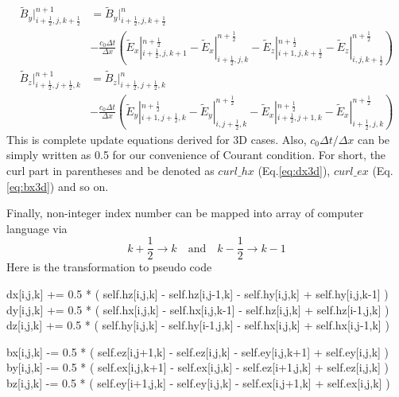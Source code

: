 \begin{equation}\label{eq:by3d}
  \begin{split}
    \widetilde{B}_y|_{i+\frac{1}{2},j,k+\frac{1}{2}}^{n+1} & = \widetilde{B}_y|_{i+\frac{1}{2},j,k+\frac{1}{2}}^{n}\\
    & - \frac{c_0\Delta t}{\Delta x}\left(\widetilde{E}_x|_{i+\frac{1}{2},j,k+1}^{n+\frac{1}{2}} - \widetilde{E}_x|_{i+\frac{1}{2},j,k}^{n+\frac{1}{2}} - \widetilde{E}_z|_{i+1,j,k+\frac{1}{2}}^{n+\frac{1}{2}} - \widetilde{E}_z|_{i,j,k+\frac{1}{2}}^{n+\frac{1}{2}}\right)
  \end{split}
\end{equation}
\begin{equation}
  \begin{split}
    \widetilde{B}_z|_{i+\frac{1}{2},j+\frac{1}{2},k}^{n+1} & = \widetilde{B}_z|_{i+\frac{1}{2},j+\frac{1}{2},k}^{n}\\
    & - \frac{c_0\Delta t}{\Delta x}\left(\widetilde{E}_y|_{i+1,j+\frac{1}{2},k}^{n+\frac{1}{2}} - \widetilde{E}_y|_{i,j+\frac{1}{2},k}^{n+\frac{1}{2}} - \widetilde{E}_x|_{i+\frac{1}{2},j+1,k}^{n+\frac{1}{2}} - \widetilde{E}_x|_{i+\frac{1}{2},j,k}^{n+\frac{1}{2}}\right)
  \end{split}
\end{equation}
This is complete update equations derived for 3D cases. Also, $c_0\Delta t/\Delta x$ can be simply written as 0.5 for
our convenience of Courant condition. For short, the curl part in parentheses and be denoted as $curl\_hx$
(Eq.\ref{eq:dx3d}), $curl\_ex$ (Eq.\ref{eq:bx3d}) and so on.

Finally, non-integer index number can be mapped into array of computer language via
\begin{equation}
  k+\frac{1}{2}\rightarrow k\quad \mathrm{and} \quad
  k-\frac{1}{2}\rightarrow k-1
\end{equation}
Here is the transformation to pseudo code
\begin{code}
  dx[i,j,k] += 0.5 * ( self.hz[i,j,k] - self.hz[i,j-1,k] 
                     - self.hy[i,j,k] + self.hy[i,j,k-1] )
  dy[i,j,k] += 0.5 * ( self.hx[i,j,k] - self.hx[i,j,k-1] 
                     - self.hz[i,j,k] + self.hz[i-1,j,k] )
  dz[i,j,k] += 0.5 * ( self.hy[i,j,k] - self.hy[i-1,j,k] 
                     - self.hx[i,j,k] + self.hx[i,j-1,k] )
  
  bx[i,j,k] -= 0.5 * ( self.ez[i,j+1,k] - self.ez[i,j,k] 
                     - self.ey[i,j,k+1] + self.ey[i,j,k] )
  by[i,j,k] -= 0.5 * ( self.ex[i,j,k+1] - self.ex[i,j,k] 
                     - self.ez[i+1,j,k] + self.ez[i,j,k] )
  bz[i,j,k] -= 0.5 * ( self.ey[i+1,j,k] - self.ey[i,j,k] 
                     - self.ex[i,j+1,k] + self.ex[i,j,k] )
\end{code}




